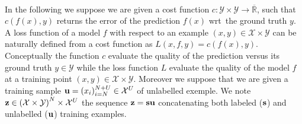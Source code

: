 \paragraph{}
In the following we suppose we are given a cost function
$c:\mathcal{Y}\times\mathcal{Y}\to\overline{\mathbb{R}}$, such that $c(f(x),y)$
returns the error of the prediction $f(x)$ \acs{wrt}~the ground truth $y$. A
loss function of a model $f$ with respect to an example
$(x,y)\in\mathcal{X}\times\mathcal{Y}$ can be naturally defined from a cost
function as $L(x,f,y)=c(f(x),y)$. Conceptually the function $c$ evaluate the
quality of the prediction versus its ground truth $y\in\mathcal{Y}$ while the
loss function $L$ evaluate the quality of the model $f$ at a training point
$(x,y)\in\mathcal{X}\times\mathcal{Y}$. Moreover we suppose that we are given a
training sample $\boldsymbol{\mathbf{u}}=(x_i)_{i=N}^{N+U}\in\mathcal{X}^U$ of unlabelled
exemple. We note
$\boldsymbol{\mathbf{z}}\in\left(\mathcal{X}\times\mathcal{Y}\right)^N\times\mathcal{X}^U$ the
sequence $\boldsymbol{\mathbf{z}}=\boldsymbol{\mathbf{s}}\boldsymbol{\mathbf{u}}$ concatenating both labeled ($\boldsymbol{\mathbf{s}}$) and
unlabelled ($\boldsymbol{\mathbf{u}}$) training examples.
